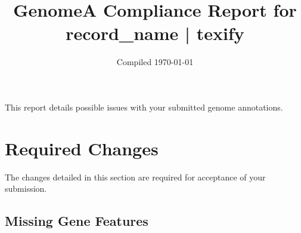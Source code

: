 \documentclass[]{article}
\date{Compiled \today}
\title{GenomeA Compliance Report for {{record_name | texify}}}
\begin{document}
\maketitle
This report details possible issues with your submitted genome annotations.

\section{Required Changes}

The changes detailed in this section are required for acceptance of your
submission.

\subsection{Missing Gene Features}
\end{document}
